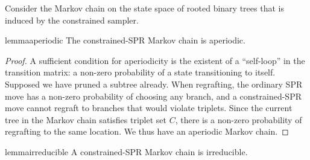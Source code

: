 Consider the Markov chain on the state space 
of rooted binary trees that is induced by the constrained sampler.
\begin{restatable}{lemma}{aperiodic}
The constrained-SPR Markov chain is aperiodic.
\end{restatable}
\begin{proof}
A sufficient condition for aperiodicity
is the existent of a ``self-loop'' in the transition matrix: a non-zero probability of a state transitioning to itself.
Supposed we have pruned a subtree already.
When regrafting, the ordinary SPR move
has a non-zero probability of choosing any branch,
and a constrained-SPR move cannot regraft
to branches that would violate triplets.
Since the current tree in the Markov chain
satisfies triplet set $C$, there is a non-zero probability
of regrafting to the same location. 
We thus have an aperiodic Markov chain.
\end{proof}



\begin{restatable}{lemma}{irreducible}
\label{thm:irr}
A constrained-SPR Markov chain is irreducible.
\end{restatable}

